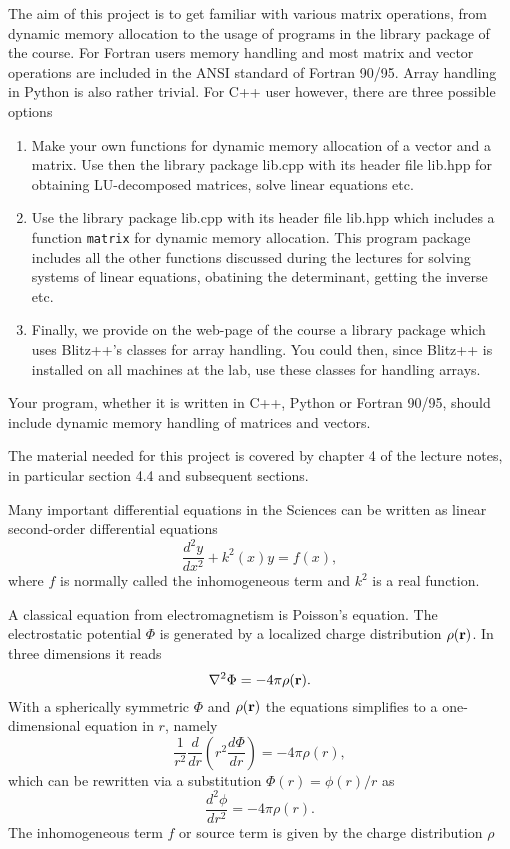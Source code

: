 \documentclass[11pt,a4wide]{article}
\begin{document}
The aim of this project is to get familiar with various matrix operations,
from dynamic memory allocation to the usage of programs in the library
package of the course. 
For Fortran users memory handling and most matrix and vector operations
are included in the ANSI standard of Fortran 90/95. Array handling in Python is also rather trivial. For C++ user however,
there are three possible options
\begin{enumerate}
\item Make your own functions for dynamic memory allocation of a 
vector and a matrix. Use then the 
library package lib.cpp with its header file 
lib.hpp for obtaining LU-decomposed matrices, solve linear equations
etc.
\item Use the library package lib.cpp with its header file 
lib.hpp which includes a function \verb?matrix? for dynamic memory
allocation. This program package includes all the other functions
discussed during the lectures for solving systems of linear equations,
obatining the determinant, getting the inverse etc.
\item Finally, we provide on the web-page of the course a library package
which uses Blitz++'s classes for array handling. You could then, since
Blitz++ is installed on all machines at the lab, use these classes for handling
arrays.
\end{enumerate}

Your program, whether it is written in C++, Python 
or Fortran 90/95, should include
dynamic memory handling of matrices and vectors. 

The material needed for this project is covered by chapter 4 of the lecture notes, in particular section 4.4 and subsequent sections.



Many important differential equations in the Sciences can be written as 
linear second-order differential equations 
\[
\frac{d^2y}{dx^2}+k^2(x)y = f(x),
\]
where $f$ is normally called the inhomogeneous term and $k^2$ is a real function.

A classical equation from electromagnetism is Poisson's equation.
The electrostatic potential $\Phi$ is generated by a localized charge
distribution $\rho ({\bf r})$.   In three dimensions 
it reads
\[
\nabla^2 \Phi = -4\pi \rho ({\bf r}).
\]
With a spherically symmetric $\Phi$ and $\rho ({\bf r})$  the equations
simplifies to a one-dimensional equation in $r$, namely
\[
\frac{1}{r^2}\frac{d}{dr}\left(r^2\frac{d\Phi}{dr}\right) = -4\pi \rho(r),
\]
which can be rewritten via a substitution $\Phi(r)= \phi(r)/r$ as
\[
\frac{d^2\phi}{dr^2}= -4\pi\rho(r).
\]
The inhomogeneous term $f$ or source term is given by the charge distribution
$\rho$
\end{document}
